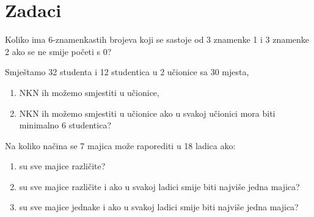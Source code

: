 \section{Zadaci}

\begin{example}
    Koliko ima 6-znamenkastih brojeva koji se sastoje od 3 znamenke 1 i 3
    znamenke 2 ako se ne smije početi s 0?
\end{example}

\begin{example}
    Smještamo 32 studenta i 12 studentica u 2 učionice sa 30 mjesta,
    \begin{enumerate}
        \item NKN ih možemo smjestiti u učionice,
        \item NKN ih možemo smjestiti u učionice ako u svakoj učionici mora biti
        minimalno 6 studentica?
    \end{enumerate}
\end{example}

\begin{example}
    Na koliko načina se 7 majica može raporediti u 18 ladica ako:
    \begin{enumerate}
        \item su sve majice različite?
        \item su sve majice različite i ako u svakoj ladici smije biti najviše jedna majica?
        \item su sve majice jednake i ako u svakoj ladici smije biti najviše jedna majica?
    \end{enumerate}
\end{example}
